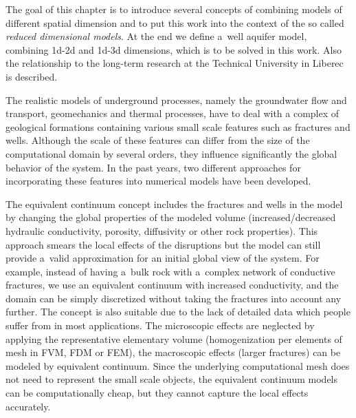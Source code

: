 The goal of this chapter is to introduce several concepts of combining models of different spatial dimension and 
to put this work into the context of the so called \emph{reduced dimensional models}.
At the end we define a~well aquifer model, combining 1d-2d and 1d-3d dimensions, which is to be solved in this work.
Also the relationship to the long-term research at the Technical University in Liberec is described.%

The realistic models of underground processes, namely the groundwater flow and transport, geomechanics and thermal processes, have to deal with 
a complex of geological formations containing various small scale features such as fractures and wells. Although the scale of these features
can differ from the size of the computational domain by several orders, they influence significantly the global behavior of the system.
In the past years, two different approaches for incorporating these features into numerical models have been developed.


The equivalent continuum concept includes the fractures and wells in the model by changing the global properties of the modeled volume
(increased/decreased hydraulic conductivity, porosity, diffusivity or other rock properties).
This approach smears the local effects of the disruptions but the model can still provide a~valid approximation for an initial global view of the system.
For example, instead of having a~bulk rock with a~complex network of conductive fractures, we use an equivalent continuum with increased conductivity,
and the domain can be simply discretized without taking the fractures into account any further.
The concept is also suitable due to the lack of detailed data which people suffer from in most applications.
The microscopic effects are neglected by applying the representative elementary volume (homogenization per elements of mesh in FVM, FDM or FEM),
the macroscopic effects (larger fractures) can be modeled by equivalent continuum.
Since the underlying computational mesh does not need to represent the small scale objects, the equivalent continuum models can be computationally cheap,
but they cannot capture the local effects accurately.


